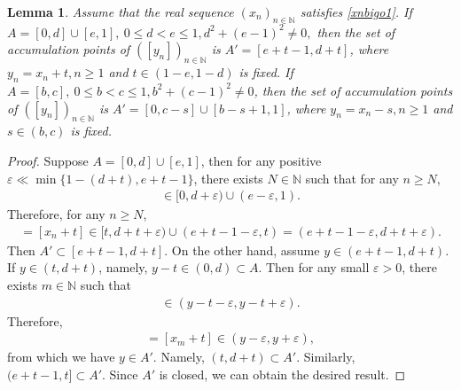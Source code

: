 \documentclass[12pt]{amsart}
\theoremstyle{plain}
\newtheorem{lemma}[theorem]{Lemma}
\theoremstyle{definition}
\begin{document}
\begin{lemma}\label{lemequcd}
		Assume that the real sequence $(x_n)_{n\in\mathbb{N}}$ satisfies \eqref{xnbigo1}. If $A=[0,d]\cup [e,1], \ 0\leq d<e\leq 1,d^2+(e-1)^2\neq0,$ then the set of accumulation points of $([y_n])_{n\in\mathbb{N}}$ is $A'=[e+t-1,d+t]$, where $y_n=x_n+t, n\geq 1$ and $t\in (1-e,1-d)$ is fixed.
		If $A=[b,c],\ 0\leq b<c\leq 1,b^2+(c-1)^2\neq 0$, then the set of accumulation points of $([y_n])_{n\in\mathbb{N}}$ is $A'=[0,c-s]\cup [b-s+1,1]$, where $y_n=x_n-s, n\geq 1$ and $s\in (b,c)$ is fixed.
\end{lemma}
\begin{proof}
	Suppose $A=[0,d]\cup [e,1]$, then for any positive $\varepsilon\ll \min\{1-(d+t),e+t-1\}$, there exists $N\in\mathbb{N}$ such that for any $n\geq N$,
	\begin{align}
		[x_n]\in [0,d+\varepsilon)\cup (e-\varepsilon,1).\nonumber
	\end{align}
	Therefore, for any $n\geq N$,
	\begin{align}
		[y_n]=[x_n+t]\in [t,d+t+\varepsilon)\cup(e+t-1-\varepsilon,t)=(e+t-1-\varepsilon,d+t+\varepsilon).\nonumber
	\end{align}
	Then $A'\subset [e+t-1,d+t]$.
	On the other hand, assume $y\in (e+t-1,d+t)$. If $y\in (t,d+t)$, namely, $y-t\in (0,d)\subset A$. Then for any small $\varepsilon>0$, there exists $m\in\mathbb{N}$ such that
	\begin{align}
		[x_m]\in (y-t-\varepsilon,y-t+\varepsilon).\nonumber
	\end{align}
	Therefore,
	\begin{align}
		[y_m]=[x_m+t]\in (y-\varepsilon,y+\varepsilon),\nonumber
	\end{align}
	from which we have $y\in A'$. Namely, $(t,d+t)\subset A'$. Similarly, $(e+t-1,t]\subset A'$.
  Since $A'$ is closed, we can obtain the desired result.
	

\end{proof}
\end{document}
